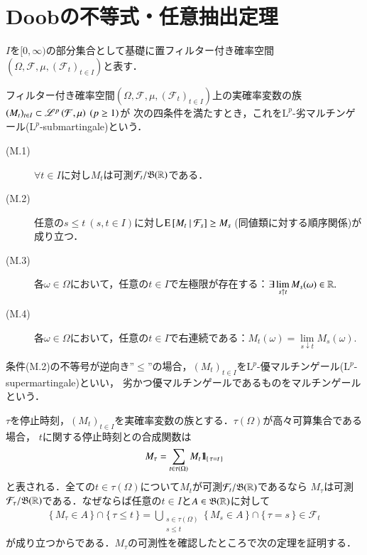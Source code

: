 \section{Doobの不等式・任意抽出定理}
	
	$I$を$[0,\infty)$の部分集合として基礎に置フィルター付き確率空間$(\Omega,\mathcal{F},\mu,(\mathcal{F}_t)_{t \in I})$と表す．
	
	\begin{itembox}[l]{}
		\begin{dfn}[マルチンゲール]
			フィルター付き確率空間$(\Omega,\mathcal{F},\mu,(\mathcal{F}_t)_{t \in I})$上の実確率変数の族
			$(M_t)_{t \in I} \subset \mathscr{L}^{p} \left(\mathcal{F},\mu\right)\ (p \geq 1)$が
			次の四条件を満たすとき，これを$\mathrm{L}^p$-劣マルチンゲール($\mathrm{L}^p$-submartingale)という．
			\begin{description}
				\item[(M.1)] $\forall t \in I$に対し$M_t$は可測$\mathcal{F}_t/\mathfrak{B}(\mathbb{R})$である．
				\item[(M.2)] 任意の$s \leq t\ (s,t \in I)$に対し$\cexp{M_t}{\mathcal{F}_s} \geq M_s\ $({\scriptsize 同値類に対する順序関係})が成り立つ．
				\item[(M.3)] 各$\omega \in \Omega$において，任意の$t \in I$で左極限が存在する：$\exists \lim\limits_{s \uparrow t} M_s(\omega) \in \mathbb{R}.$
				\item[(M.4)] 各$\omega \in \Omega$において，任意の$t \in I$で右連続である：$M_t(\omega) = \lim\limits_{s \downarrow t} M_s(\omega).$
			\end{description}
			条件(M.2)の不等号が逆向き''$\leq$''の場合，$(M_t)_{t \in I}$を$\mathrm{L}^p$-優マルチンゲール($\mathrm{L}^p$-supermartingale)といい，
			劣かつ優マルチンゲールであるものをマルチンゲールという．
			\label{dfn:martingale}
		\end{dfn}
	\end{itembox}
	
	$\tau$を停止時刻，$(M_t)_{t \in I}$を実確率変数の族とする．$\tau(\Omega)$が高々可算集合である場合，
	$t$に関する停止時刻との合成関数は
	\begin{align}
		M_\tau = \sum_{t \in \tau(\Omega)}M_t \mbox{1}\hspace{-0.25em}\mbox{l}_{\{\, \tau = t\, \}}
	\end{align}
	と表される．全ての$t \in \tau(\Omega)$について$M_t$が可測$\mathcal{F}_t/\mathfrak{B}(\mathbb{R})$であるなら
	$M_\tau$は可測$\mathcal{F}_\tau/\mathfrak{B}(\mathbb{R})$である．なぜならば任意の$t \in I$と$A \in \mathfrak{B}(\mathbb{R})$に対して
	\begin{align}
		\{\, M_\tau \in A\, \} \cap \{\, \tau \leq t\, \}
		= \bigcup_{\substack{s \in \tau(\Omega) \\ s \leq t}}\{\, M_s \in A\, \} \cap \{\, \tau = s\, \} \in \mathcal{F}_t 
	\end{align}
	が成り立つからである．$M_\tau$の可測性を確認したところで次の定理を証明する．
	
